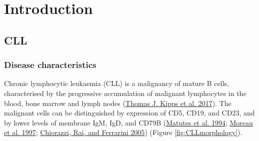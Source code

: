 \documentclass[11pt, a4paper, twosided]{book}
\begin{document}
\begin{tabular}{rp{0.2cm}lp{1cm}rp{0.2cm}l}
    
   
\end{tabular}
\newpage
\listoffigures
{}

\newpage
\listoftables
{}

\newpage
\pagestyle{plain} %
\setcounter{page}{1}    %

\hypertarget{introduction}{%
\chapter{Introduction}\label{introduction}}

\hypertarget{cll}{%
\section{CLL}\label{cll}}

\hypertarget{intro-disease-characteristics}{%
\subsection{Disease characteristics}\label{intro-disease-characteristics}}

Chronic lymphocytic leukaemia (CLL) is a malignancy of mature B cells, characterised by the progressive accumulation of malignant lymphocytes in the blood, bone marrow and lymph nodes (\protect\hyperlink{ref-Kipps2017}{Thomas J. Kipps et al. 2017}). The malignant cells can be distinguished by expression of CD5, CD19, and CD23, and by lower levels of membrane IgM, IgD, and CD79B (\protect\hyperlink{ref-Matutes1994}{Matutes et al. 1994}; \protect\hyperlink{ref-Moreau1997}{Moreau et al. 1997}; \protect\hyperlink{ref-Chiorazzi2005}{Chiorazzi, Rai, and Ferrarini 2005}) (Figure \ref{fig:CLLmorphology}).
\end{document}
